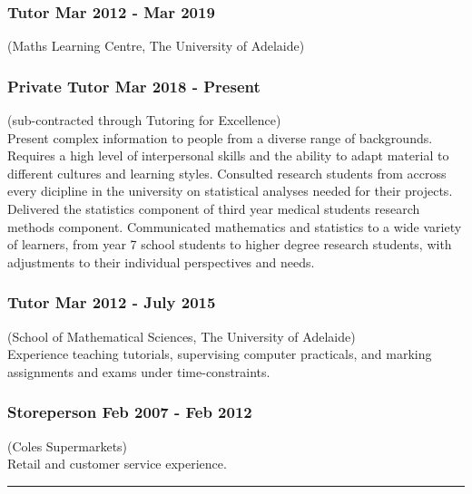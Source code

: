\documentclass[a4paper,12pt]{report}
\begin{document}
\subsubsection*{Tutor \hfill Mar 2012 - Mar 2019} \vspace{-6pt}
(Maths Learning Centre, The University of Adelaide) \\[4pt]

\subsubsection*{Private Tutor \hfill Mar 2018 - Present} \vspace{-6pt}
(sub-contracted through Tutoring for Excellence) \\[4pt]

Present complex information to people from a diverse range of backgrounds. Requires a high level of interpersonal skills and the ability to adapt material to different cultures and learning styles. Consulted research students from accross every dicipline in the university on statistical analyses needed for their projects. Delivered the statistics component of third year medical students research methods component. Communicated mathematics and statistics to a wide variety of learners, from year 7 school students to higher degree research students, with adjustments to their individual perspectives and needs.

\subsubsection*{Tutor \hfill Mar 2012 - July 2015} \vspace{-6pt}
(School of Mathematical Sciences, The University of Adelaide) \\[4pt]

Experience teaching tutorials, supervising computer practicals, and marking assignments and exams under time-constraints.

\subsubsection*{Storeperson \hfill Feb 2007 - Feb 2012} \vspace{-6pt}
(Coles Supermarkets) \\[4pt]

Retail and customer service experience.


\vspace{1cm}
\hrule
\end{document}
